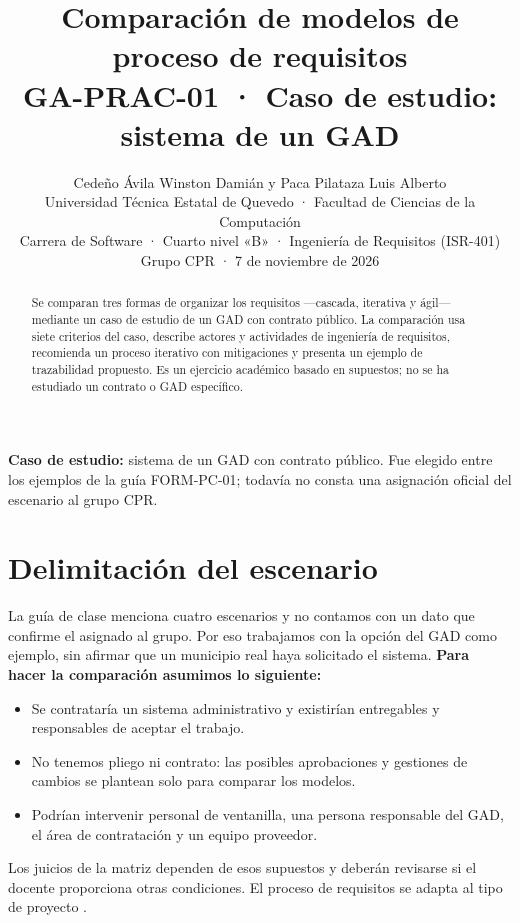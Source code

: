 \documentclass[10pt,a4paper,onecolumn]{IEEEtran}
\title{Comparación de modelos de proceso de requisitos\\
\large GA-PRAC-01 · Caso de estudio: sistema de un GAD}
\author{Cedeño Ávila Winston Damián y Paca Pilataza Luis Alberto\\
{\small Universidad Técnica Estatal de Quevedo · Facultad de Ciencias de la Computación}\\
{\small Carrera de Software · Cuarto nivel «B» · Ingeniería de Requisitos (ISR-401)}\\
{\small Grupo CPR · 7 de noviembre de 2026}}
\begin{document}
\maketitle
\begin{abstract}
Se comparan tres formas de organizar los requisitos —cascada, iterativa y ágil— mediante un caso de estudio de un GAD con contrato público. La comparación usa siete criterios del caso, describe actores y actividades de ingeniería de requisitos, recomienda un proceso iterativo con mitigaciones y presenta un ejemplo de trazabilidad propuesto. Es un ejercicio académico basado en supuestos; no se ha estudiado un contrato o GAD específico.
\end{abstract}
\textbf{Caso de estudio:} sistema de un GAD con contrato público. Fue elegido entre los ejemplos de la guía FORM-PC-01; todavía no consta una asignación oficial del escenario al grupo CPR.

\section{Delimitación del escenario}
La guía de clase menciona cuatro escenarios y no contamos con un dato que confirme el asignado al grupo. Por eso trabajamos con la opción del GAD como ejemplo, sin afirmar que un municipio real haya solicitado el sistema.
\textbf{Para hacer la comparación asumimos lo siguiente:}
\begin{itemize}
\item Se contrataría un sistema administrativo y existirían entregables y responsables de aceptar el trabajo.
\item No tenemos pliego ni contrato: las posibles aprobaciones y gestiones de cambios se plantean solo para comparar los modelos.
\item Podrían intervenir personal de ventanilla, una persona responsable del GAD, el área de contratación y un equipo proveedor.
\end{itemize}
Los juicios de la matriz dependen de esos supuestos y deberán revisarse si el docente proporciona otras condiciones. El proceso de requisitos se adapta al tipo de proyecto \cite{pohl2025,ireb2026}.
\end{document}
